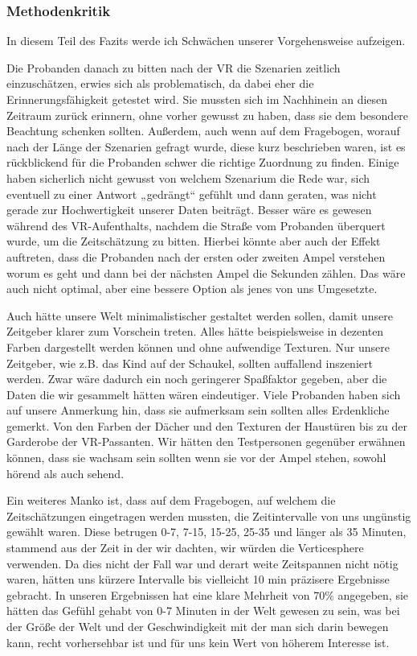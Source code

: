 \documentclass{Bericht}
\begin{document}
\subsubsection{Methodenkritik}
In diesem Teil des Fazits werde ich Schwächen unserer Vorgehensweise aufzeigen.
\par
Die Probanden danach zu bitten nach der VR die Szenarien zeitlich einzuschätzen, erwies sich als problematisch, da dabei eher die Erinnerungsfähigkeit getestet wird. Sie mussten sich im Nachhinein an diesen Zeitraum zurück erinnern, ohne vorher gewusst zu haben, dass sie dem besondere Beachtung schenken sollten. Außerdem, auch wenn auf dem Fragebogen, worauf nach der Länge der Szenarien gefragt wurde, diese kurz beschrieben waren, ist es rückblickend für die Probanden schwer die richtige Zuordnung zu finden. Einige haben sicherlich nicht gewusst von welchem Szenarium die Rede war, sich eventuell zu einer Antwort „gedrängt“ gefühlt und dann geraten, was nicht gerade zur Hochwertigkeit unserer Daten beiträgt. Besser wäre es gewesen während des VR-Aufenthalts, nachdem die Straße vom Probanden überquert wurde, um die Zeitschätzung zu bitten. Hierbei könnte aber auch der Effekt auftreten, dass die Probanden nach der ersten oder zweiten Ampel verstehen worum es geht und dann bei der nächsten Ampel die Sekunden zählen. Das wäre auch nicht optimal, aber eine bessere Option als jenes von uns Umgesetzte.
\par
Auch hätte unsere Welt minimalistischer gestaltet werden sollen, damit unsere Zeitgeber klarer zum Vorschein treten. Alles hätte beispielsweise in dezenten Farben dargestellt werden können und ohne aufwendige Texturen. Nur unsere Zeitgeber, wie z.B. das Kind auf der Schaukel, sollten auffallend inszeniert werden. Zwar wäre dadurch ein noch geringerer Spaßfaktor gegeben, aber die Daten die wir gesammelt hätten wären eindeutiger. Viele Probanden haben sich auf unsere Anmerkung hin, dass sie aufmerksam sein sollten alles Erdenkliche gemerkt. Von den Farben der Dächer und den Texturen der Haustüren bis zu der Garderobe der VR-Passanten. Wir hätten den Testpersonen gegenüber erwähnen können, dass sie wachsam sein sollten wenn sie vor der Ampel stehen, sowohl hörend als auch sehend.
\par
Ein weiteres Manko ist, dass auf dem Fragebogen, auf welchem die Zeitschätzungen eingetragen werden mussten,  die Zeitintervalle von uns ungünstig gewählt waren. Diese betrugen 0-7, 7-15, 15-25, 25-35 und länger als 35 Minuten, stammend aus der Zeit in der wir dachten, wir würden die Verticesphere verwenden. Da dies nicht der Fall war und derart weite Zeitspannen nicht nötig waren, hätten uns kürzere Intervalle bis vielleicht 10 min präzisere Ergebnisse gebracht. In unseren Ergebnissen hat eine klare Mehrheit von 70\% angegeben, sie hätten das Gefühl gehabt von 0-7 Minuten in der Welt gewesen zu sein, was bei der Größe der Welt und der Geschwindigkeit mit der man sich darin bewegen kann, recht vorhersehbar ist und für uns kein Wert von höherem Interesse ist.
\end{document}
